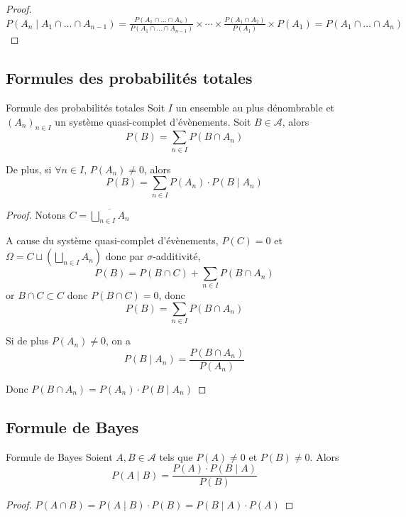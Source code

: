 \begin{proof}
    $P(A_n \mid A_1 \cap \dots \cap A_{n - 1}) = \frac{P(A_1 \cap \dots \cap A_n)}{P(A_1 \cap \dots \cap A_{n - 1})} \times \cdots \times \frac{P(A_1 \cap A_2)}{P(A_1)} \times P(A_1) = P(A_1 \cap \dots \cap A_n)$
\end{proof}

\subsection{Formules des probabilités totales }

\begin{theoreme}{Formule des probabilités totales}{}
    Soit $I$ un ensemble au plus dénombrable et $(A_n)_{n \in I}$ un système quasi-complet d'évènements.
    Soit $B \in \mathcal A$, alors 
    $$P(B) = \sum_{n \in I} P(B \cap A_n)$$

    De plus, si $\forall n \in I, \, P(A_n) \neq 0$, alors
    $$P(B) = \sum_{n \in I} P(A_n) \cdot P(B \mid A_n)$$
\end{theoreme}

\begin{proof}
    Notons $\displaystyle C = \overline{ \bigsqcup_{n \in I} A_n }$

    A cause du système quasi-complet d'évènements, $P(C) = 0$ et 
    $\displaystyle \Omega = C \sqcup \left( \bigsqcup_{n \in I} A_n \right)$
    donc par $\sigma$-additivité,
    $$ P(B) = P(B \cap C) + \sum_{n \in I} P(B \cap A_n) $$
    or $B \cap C \subset C$ donc $P(B \cap C) = 0$, 
    donc $$ P(B) = \sum_{n \in I} P(B \cap A_n) $$

    Si de plus $P(A_n) \neq 0$, on a 
    $$ P(B \mid A_n) = \frac{P(B \cap A_n)}{P(A_n)} $$

    Donc $ P(B \cap A_n) = P(A_n) \cdot P(B \mid A_n) $
\end{proof}

\subsection{Formule de Bayes}

\begin{theoreme}{Formule de Bayes}{}
    Soient $A, B \in \mathcal A$ tels que $P(A) \neq 0$ et $P(B) \neq 0$.
    Alors 
    $$ P(A \mid B) = \frac{P(A) \cdot P(B \mid A)}{P(B)} $$
\end{theoreme}

\begin{proof}
    $P(A \cap B) = P(A \mid B) \cdot P(B) = P(B \mid A) \cdot P(A)$
\end{proof}

